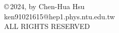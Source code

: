 \clearpage
\vspace*{130mm}
\begin{center}
{%
   \thispagestyle{empty}
   \setlength{\parskip}{\baselineskip}
   \setlength{\parindent}{0pt}

   \copyright\,2024, by Chen-Hua Hsu\\
   ken91021615@hep1.phys.ntu.edu.tw \\


   ALL RIGHTS RESERVED
}%
\end{center}


\clearpage
